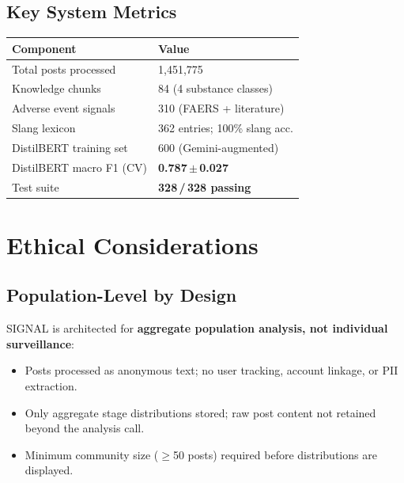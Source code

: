 \documentclass[10pt,twocolumn]{article}
\begin{document}
\subsection{Key System Metrics}

\begin{center}{\small\setlength{\tabcolsep}{4pt}
\begin{tabular}{@{}p{3.8cm}l@{}}
\toprule
\textbf{Component} & \textbf{Value}\\
\midrule
Total posts processed    & 1,451,775\\
Knowledge chunks         & 84 (4 substance classes)\\
Adverse event signals    & 310 (FAERS + literature)\\
Slang lexicon            & 362 entries; 100\% slang acc.\\
DistilBERT training set  & 600 (Gemini-augmented)\\
DistilBERT macro F1 (CV) & \textbf{0.787\,$\pm$\,0.027}\\
Test suite               & \textbf{328\,/\,328 passing}\\
\bottomrule
\end{tabular}}\end{center}


\section{Ethical Considerations}

\subsection{Population-Level by Design}
SIGNAL is architected for \textbf{aggregate population analysis, not
individual surveillance}:
\begin{itemize}
  \item Posts processed as anonymous text; no user tracking, account linkage,
    or PII extraction.
  \item Only aggregate stage distributions stored; raw post content not
    retained beyond the analysis call.
  \item Minimum community size (${\geq}$50 posts) required before distributions
    are displayed.
\end{itemize}
\end{document}
